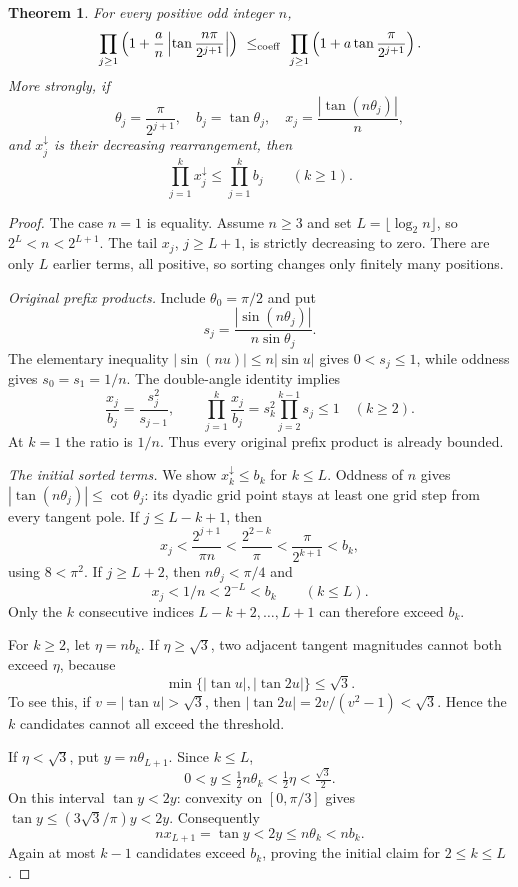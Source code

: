 \documentclass[11pt,a4paper]{article}
\newtheorem{theorem}{Theorem}[section]
\theoremstyle{remark}\newtheorem*{ednote}{Editorial note (ProveIt, 2026-10-01)}
\begin{document}
\begin{theorem}\label{thm:tangent}
For every positive odd integer $n$,
\begin{equation}\label{eq:productcomparison}
 \prod_{j\ge1}\left(1+\frac an
                \left|\tan\frac{n\pi}{2^{j+1}}\right|\right)
 \ \le_{\rm coeff}\
 \prod_{j\ge1}\left(1+a\tan\frac{\pi}{2^{j+1}}\right).
\end{equation}
More strongly, if
\[
 \theta_j=\frac\pi{2^{j+1}},\quad b_j=\tan\theta_j,\quad
 x_j=\frac{|\tan(n\theta_j)|}{n},
\]
and $x_j^\downarrow$ is their decreasing rearrangement, then
\begin{equation}\label{eq:logmajor}
 \prod_{j=1}^k x_j^\downarrow\le\prod_{j=1}^k b_j
 \qquad(k\ge1).
\end{equation}
\end{theorem}
\begin{proof}
The case $n=1$ is equality. Assume $n\ge3$ and set $L=\lfloor\log_2n\rfloor$, so $2^L<n<2^{L+1}$. The tail $x_j$, $j\ge L+1$, is strictly decreasing to zero. There are only $L$ earlier terms, all positive, so sorting changes only finitely many positions.

\emph{Original prefix products.} Include $\theta_0=\pi/2$ and put
\[
 s_j=\frac{|\sin(n\theta_j)|}{n\sin\theta_j}.
\]
The elementary inequality $|\sin(nu)|\le n|\sin u|$ gives $0<s_j\le1$, while oddness gives $s_0=s_1=1/n$. The double-angle identity implies
\[
 \frac{x_j}{b_j}=\frac{s_j^2}{s_{j-1}},\qquad
 \prod_{j=1}^k\frac{x_j}{b_j}
 =s_k^2\prod_{j=2}^{k-1}s_j\le1\quad(k\ge2).
\]
At $k=1$ the ratio is $1/n$. Thus every original prefix product is already bounded.

\emph{The initial sorted terms.} We show $x_k^\downarrow\le b_k$ for $k\le L$. Oddness of $n$ gives $|\tan(n\theta_j)|\le\cot\theta_j$: its dyadic grid point stays at least one grid step from every tangent pole. If $j\le L-k+1$, then
\[
 x_j<\frac{2^{j+1}}{\pi n}
 <\frac{2^{2-k}}\pi<\frac\pi{2^{k+1}}<b_k,
\]
using $8<\pi^2$. If $j\ge L+2$, then $n\theta_j<\pi/4$ and
\[
 x_j<1/n<2^{-L}<b_k\qquad(k\le L).
\]
Only the $k$ consecutive indices $L-k+2,\ldots,L+1$ can therefore exceed $b_k$.

For $k\ge2$, let $\eta=nb_k$. If $\eta\ge\sqrt3$, two adjacent tangent magnitudes cannot both exceed $\eta$, because
\[
 \min\{|\tan u|,|\tan2u|\}\le\sqrt3.
\]
To see this, if $v=|\tan u|>\sqrt3$, then $|\tan2u|=2v/(v^2-1)<\sqrt3$. Hence the $k$ candidates cannot all exceed the threshold.

If $\eta<\sqrt3$, put $y=n\theta_{L+1}$. Since $k\le L$,
\[
 0<y\le\tfrac12 n\theta_k<\tfrac12\eta<\tfrac{\sqrt3}2.
\]
On this interval $\tan y<2y$: convexity on $[0,\pi/3]$ gives $\tan y\le(3\sqrt3/\pi)y<2y$. Consequently
\[
 nx_{L+1}=\tan y<2y\le n\theta_k<nb_k.
\]
Again at most $k-1$ candidates exceed $b_k$, proving the initial claim for $2\le k\le L$.


\end{proof}
\end{document}
